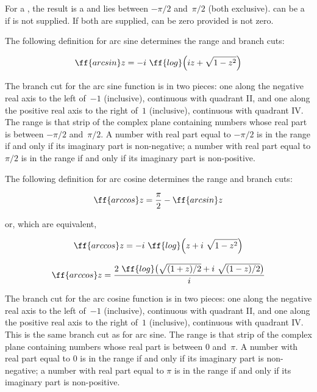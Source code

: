 For a 
, 
the result is 
a 
and lies between
$-\pi/2$ and~$\pi/2$ (both exclusive).
 can be a  if 
is not supplied. If both are supplied,  can be zero provided
 is not zero.  

The following definition for arc sine determines the range and
branch cuts:

$$ \ff{arcsin} z = -i\ \ff{log} \Bigl(iz+\sqrt{1-z^2}\Bigr) $$

The branch cut for the arc sine function is in two pieces:
one along the negative real axis to the left of~$-1$
(inclusive), continuous with quadrant II, and one along the positive real
axis to the right of~$1$ (inclusive), continuous with quadrant IV.  The
range is that strip of the complex plane containing numbers whose real
part is between $-\pi/2$ and~$\pi/2$.  A number with real
part equal to $-\pi/2$ is in the range if and only if its imaginary
part is non-negative; a number with real part equal to $\pi/2$ is in
the range if and only if its imaginary part is non-positive.

The following definition for arc cosine determines the range and
branch cuts:

%
%

$$ \ff{arccos} z = {\pi\over2}- \ff{arcsin} z$$

or, which are equivalent,

$$ \ff{arccos} z = -i\ \ff{log} \Bigl(z+i\ \sqrt{1-z^2}\Bigr) $$

$$ \ff{arccos} z = {{2\ \ff{log} \bigl(\sqrt{(1+z)/2} + i\ \sqrt{(1-z)/2}\bigr)}\over{i}}$$

The branch cut for the arc cosine function is in two pieces:
one along the negative real axis to the left of~$-1$
(inclusive), continuous with quadrant II, and one along the positive real
axis to the right of~$1$ (inclusive), continuous with quadrant IV.  
This is the same branch cut as for arc sine.
The range is that strip of the complex plane containing numbers whose real
part is between 0 and~$\pi$.  A number with real
part equal to 0 is in the range if and only if its imaginary
part is non-negative; a number with real part equal to $\pi$ is in
the range if and only if its imaginary part is non-positive.

